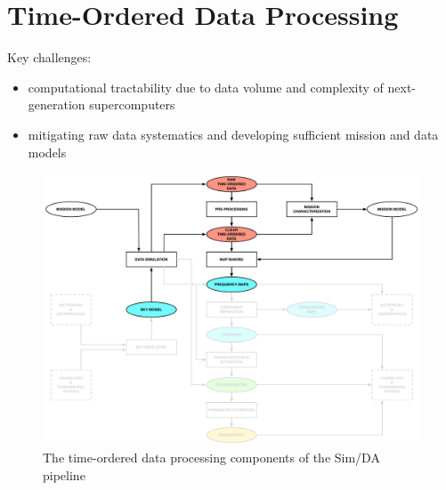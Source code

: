  
\section{Time-Ordered Data Processing}

Key challenges:
\begin{itemize}
\item computational tractability due to data volume and complexity of next-generation supercomputers
\item mitigating raw data systematics and developing sufficient mission and data models
\end{itemize}

\begin{figure}[htbp]
\centering
\includegraphics[width=1\textwidth]{Analysis/td}
\caption{The time-ordered data processing components of the Sim/DA pipeline}
\label{default}

\end{figure}
%



